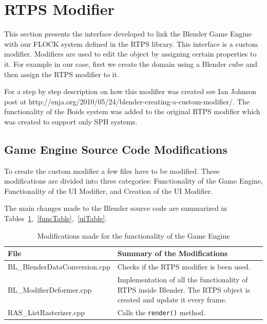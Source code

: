 \section{RTPS Modifier}\label{modifiersection}
This section presents the interface developed to link the Blender Game Engine with our FLOCK system defined in the RTPS library. This interface is a custom modifier. Modifiers are used to edit the object by assigning certain properties to it. For example in our case, first we create the domain using a Blender cube and then assign the RTPS modifier to it. 

For a step by step description on how this modifier was created see Ian Johnson post at http://enja.org/2010/05/24/blender-creating-a-custom-modifier/.  The functionality of the Boids system was added to the original RTPS modifier which was created to support only SPH systems. 

\subsection{Game Engine Source Code Modifications}
To create the custom modifier a few files have to be modified. These modifications are divided into three categories: Functionality of the Game Engine, Functionality of the UI Modifier, and  Creation of the UI Modifier.

The main changes made to the Blender source code are summarized in Tables~\ref{geTable},~\ref{funcTable},~\ref{uiTable}.


\begin{table}[htdp]
\caption{Modifications made for the functionality of the Game Engine}
\begin{center}
\begin{tabular}{|p{6cm}|p{6cm}|}
\hline 
\textbf{File} & \textbf{Summary of the Modifications} \\\hline 
BL\_BlenderDataConversion.cpp & Checks if the RTPS modifier is been used. \\\hline 
BL\_ModifierDeformer.cpp & Implementation of all the functionality of RTPS inside Blender. The RTPS object is created and update it every frame. \\\hline 
RAS\_ListRasterizer.cpp & Calls the \texttt{render()} method. \\
\hline 
\end{tabular} 
\end{center}
\label{geTable}
\end{table}

